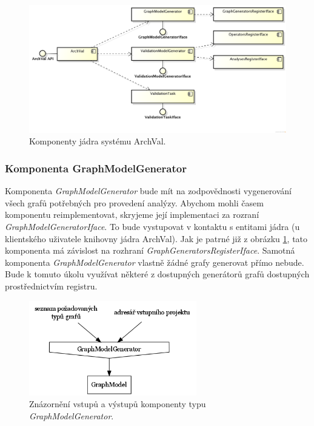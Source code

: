 \begin{figure}[h!]
  \centering
  \includegraphics[width=1.0\textwidth]{./uml/archval_core_cmp.png}
  \caption{Komponenty jádra systému ArchVal.\label{design-archval_core}}
\end{figure}

\subsubsection{Komponenta GraphModelGenerator}
Komponenta \emph{GraphModelGenerator} bude mít na zodpovědnosti vygenerování všech grafů potřebných pro provedení analýzy. Abychom mohli časem komponentu reimplementovat, skryjeme její implementaci za rozraní \emph{GraphModelGeneratorIface}. To bude vystupovat v kontaktu s  entitami jádra (u klientského uživatele knihovny jádra ArchVal). Jak je patrné již z obrázku \ref{design-archval_core}, tato komponenta má závislost na rozhraní \emph{GraphGeneratorsRegisterIface}. Samotná komponenta \emph{GraphModelGenerator} vlastně žádné grafy generovat přímo nebude. Bude k tomuto úkolu využívat některé z dostupných generátorů grafů dostupných prostřednictvím registru.

\begin{figure}[h!]
  \centering
  \includegraphics[width=0.65\textwidth]{./graphs/graph_generator_io_graph.png}
  \caption{Znázornění vstupů a výstupů komponenty typu \emph{GraphModelGenerator}.\label{design-graph_generator_io}}
\end{figure}

